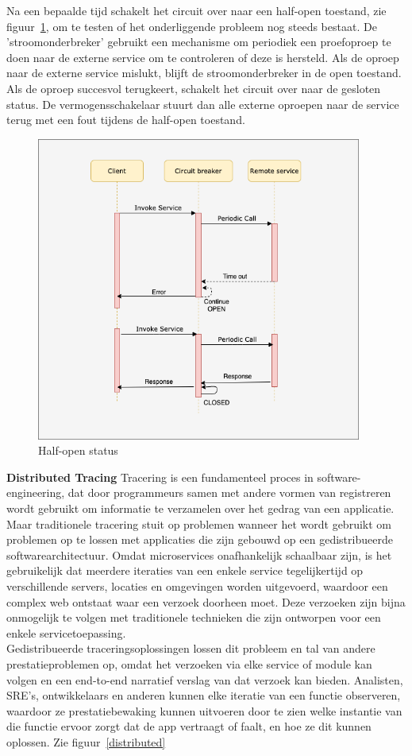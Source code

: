 Na een bepaalde tijd schakelt het circuit over naar een half-open toestand, zie figuur~\ref{halfopen}, om te testen of het onderliggende probleem nog steeds bestaat. De 'stroomonderbreker' gebruikt een mechanisme om periodiek een proefoproep te doen naar de externe service om te controleren of deze is hersteld. Als de oproep naar de externe service mislukt, blijft de stroomonderbreker in de open toestand. Als de oproep succesvol terugkeert, schakelt het circuit over naar de gesloten status. De vermogensschakelaar stuurt dan alle externe oproepen naar de service terug met een fout tijdens de half-open toestand.

\begin{figure}[!htb]
    \centering
    \includegraphics[height=10cm]{half-open.png}
    \caption{Half-open status \label{halfopen}}
\end{figure}

\textbf{Distributed Tracing}
Tracering is een fundamenteel proces in software-engineering, dat door programmeurs samen met andere vormen van registreren wordt gebruikt om informatie te verzamelen over het gedrag van een applicatie. Maar traditionele tracering stuit op problemen wanneer het wordt gebruikt om problemen op te lossen met applicaties die zijn gebouwd op een gedistribueerde softwarearchitectuur. Omdat microservices onafhankelijk schaalbaar zijn, is het gebruikelijk dat meerdere iteraties van een enkele service tegelijkertijd op verschillende servers, locaties en omgevingen worden uitgevoerd, waardoor een complex web ontstaat waar een verzoek doorheen moet. Deze verzoeken zijn bijna onmogelijk te volgen met traditionele technieken die zijn ontworpen voor een enkele servicetoepassing.
\\
Gedistribueerde traceringsoplossingen lossen dit probleem en tal van andere prestatieproblemen op, omdat het verzoeken via elke service of module kan volgen en een end-to-end narratief verslag van dat verzoek kan bieden. Analisten, SRE's, ontwikkelaars en anderen kunnen elke iteratie van een functie observeren, waardoor ze prestatiebewaking kunnen uitvoeren door te zien welke instantie van die functie ervoor zorgt dat de app vertraagt of faalt, en hoe ze dit kunnen oplossen. Zie figuur~\ref{distributed}

